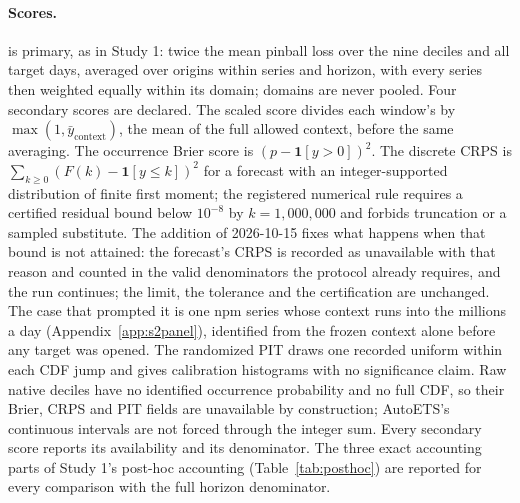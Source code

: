 \paragraph{Scores.} \qs{} is primary, as in Study 1: twice the mean pinball loss over the nine deciles and
all target days, averaged over origins within series and horizon, with every series then weighted equally
within its domain; domains are never pooled. Four secondary scores are declared. The scaled score divides
each window's \qs{} by $\max(1, \bar{y}_{\text{context}})$, the mean of the full allowed context, before the
same averaging. The occurrence Brier score is $(p - \mathbf{1}[y > 0])^2$. The discrete CRPS is
$\sum_{k \ge 0} (F(k) - \mathbf{1}[y \le k])^2$ for a forecast with an integer-supported distribution of
finite first moment; the registered numerical rule requires a certified residual bound below $10^{-8}$ by
$k = 1{,}000{,}000$ and forbids truncation or a sampled substitute. The addition of 2026-10-15 fixes what
happens when that bound is not attained: the forecast's CRPS is recorded as unavailable with that reason and
counted in the valid denominators the protocol already requires, and the run continues; the limit, the
tolerance and the certification are unchanged. The case that prompted it is one npm series whose context
runs into the millions a day (Appendix~\ref{app:s2panel}), identified from the frozen context alone before
any target was opened. The randomized PIT draws one recorded uniform within each CDF jump and gives
calibration histograms with no significance claim. Raw native deciles have no identified occurrence
probability and no full CDF, so their Brier, CRPS and PIT fields are unavailable by construction; AutoETS's
continuous intervals are not forced through the integer sum. Every secondary score reports its availability
and its denominator. The three exact accounting parts of Study 1's post-hoc accounting (Table~\ref{tab:posthoc}) are
reported for every comparison with the full horizon denominator.

